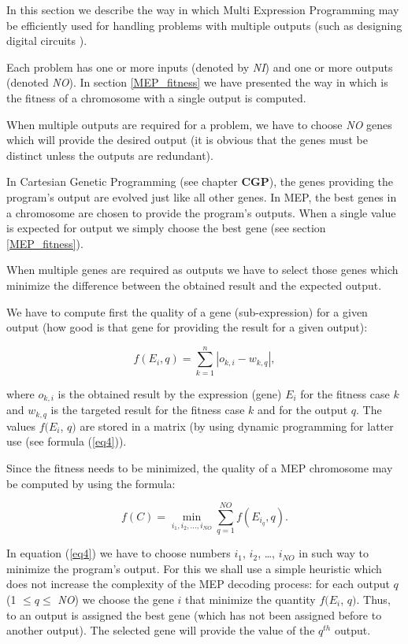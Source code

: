 \documentclass [11pt]{article}
\begin{document}
In this section we describe the way in which Multi Expression Programming 
may be efficiently used for handling problems with multiple outputs (such as designing digital circuits \cite{oltean_circuits_nasa}).

Each problem has one or more inputs (denoted by \textit{NI}) and one or more outputs 
(denoted \textit{NO}). In section \ref{MEP_fitness} we have presented the way in which is the fitness of a 
chromosome with a single output is computed. 

When multiple outputs are 
required for a problem, we have to choose \textit{NO} genes which will provide the 
desired output (it is obvious that the genes must be distinct unless the 
outputs are redundant).

In Cartesian Genetic Programming (see chapter \textbf{CGP}), the genes providing the program's output are evolved just like all 
other genes. In MEP, the best genes in a chromosome are chosen to provide 
the program's outputs. When a single value is expected for output we simply 
choose the best gene (see section \ref{MEP_fitness}). 

When multiple 
genes are required as outputs we have to select those genes which minimize 
the difference between the obtained result and the expected output. 

We have to compute first the quality of a gene (sub-expression) for a given 
output (how good is that gene for providing the result for a given output):

\begin{equation}
\label{eq3}
f(E_i ,q) = \sum\limits_{k = 1}^n {\left| {o_{k,i} - w_{k,q} } \right|} ,
\end{equation}

\noindent
where $o_{k,i}$ is the obtained result by the expression (gene) $E_{i}$ for 
the fitness case $k$ and $w_{k,q}$ is the targeted result for the fitness case 
$k$ and for the output $q$. The values $f(E_{i}$, $q)$ are stored in a matrix (by using 
dynamic programming \cite{bellman1} for latter use (see formula (\ref{eq4})).

Since the fitness needs to be minimized, the quality of a MEP chromosome may be 
computed by using the formula:


\begin{equation}
\label{eq4}
f(C) = \mathop {\min }\limits_{i_1 ,i_2 ,...,i_{NO} } \sum\limits_{q = 1}^{NO} {f(E_{i_q } ,q)} .
\end{equation}

In equation (\ref{eq4}) we have to choose numbers $i_{1}$, $i_{2}$, \ldots , 
$i_{NO}$ in such way to minimize the program's output. For this we shall use 
a simple heuristic which does not increase the complexity of the MEP 
decoding process: for each output $q$ (1 $ \le q \le $ \textit{NO}) we choose the gene 
$i$ that minimize the quantity $f(E_{i}$, $q)$. Thus, to an output is assigned the 
best gene (which has not been assigned before to another output). The 
selected gene will provide the value of the $q^{th}$ output.\\
\end{document}
